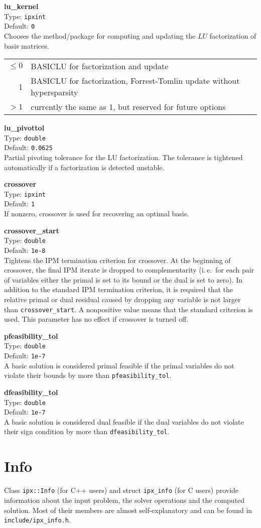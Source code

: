 \documentclass{article}
\newcommand{\ct}{\texttt}
\newcommand{\param}[4]{
  \noindent\begin{minipage}{\textwidth}
    \textbf{#1}\\
    Type: \ct{#2}\\
    Default: \ct{#3}\\
    #4
  \end{minipage}
  \vskip 1\baselineskip
}
\begin{document}
\param{lu\_kernel}{ipxint}{0}{
  Chooses the method/package for computing and updating the $LU$ factorization
  of basis matrices.\\
  \begin{tabular}{rl}
    $\le0$ & BASICLU for factorization and update \\
       1 & BASICLU for factorization, Forrest-Tomlin update without
       hypersparsity \\
       $>1$ & currently the same as 1, but reserved for future options
  \end{tabular}
}

\param{lu\_pivottol}{double}{0.0625}{
  Partial pivoting tolerance for the LU factorization. The tolerance is
  tightened automatically if a factorization is detected unstable.
}

\param{crossover}{ipxint}{1}{
  If nonzero, crossover is used for recovering an optimal basis.
}

\param{crossover\_start}{double}{1e-8}{
  Tightens the IPM termination criterion for crossover. At the beginning of
  crossover, the final IPM iterate is dropped to complementarity (i.\,e.\ for
  each pair of variables either the primal is set to its bound or the dual is
  set to zero). In addition to the standard IPM termination criterion, it is
  required that the relative primal or dual residual caused by dropping any
  variable is not larger than \ct{crossover\_start}. A nonpositive value means
  that the standard criterion is used. This parameter has no effect if crossover
  is turned off.
}

\param{pfeasibility\_tol}{double}{1e-7}{
  A basic solution is considered primal feasible if the primal variables do not
  violate their bounds by more than \ct{pfeasibility\_tol}.
}

\param{dfeasibility\_tol}{double}{1e-7}{
  A basic solution is considered dual feasible if the dual variables do not
  violate their sign condition by more than \ct{dfeasibility\_tol}.
}

\section{Info}
\label{sec:info}

Class \ct{ipx::Info} (for C++ users) and struct \ct{ipx\_info} (for C users)
provide information about the input problem, the solver operations and the
computed solution. Most of their members are almost self-explanatory and can be
found in \ct{include/ipx\_info.h}.
\end{document}
